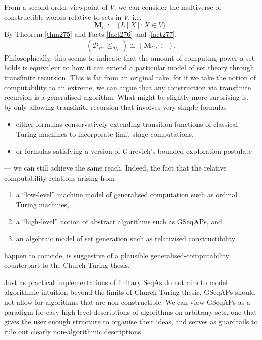 \documentclass[12pt, twoside]{memoir}
\numberwithin{equation}{section}
\theoremstyle{definition}
\theoremstyle{remark}
\theoremstyle{definition}
\theoremstyle{definition}
\theoremstyle{definition}
\theoremstyle{remark}
\begin{document}
From a second-order viewpoint of $V$, we can consider the multiverse of constructible worlds relative to sets in $V$, i.e.
\begin{equation*}
    \mathbf{M}_C := \{L[X] : X \in V\} \text{.}
\end{equation*}
By Theorem \ref{thm275} and Facts \ref{fact276} and \ref{fact277}, 
\begin{equation*}
    (\mathcal{D}_P, \leq_{\mathcal{D}_P}) \cong (\mathbf{M}_C, \subset) \text{.}
\end{equation*}
Philosophically, this seems to indicate that the amount of computing power a set holds is equivalent to how it can extend a particular model of set theory through transfinite recursion. This is far from an original take, for if we take the notion of computability to an extreme, we can argue that any construction via transfinite recursion is a generalised algorithm. What might be slightly more surprising is, by only allowing transfinite recursion that involves very simple formulas ---
\begin{itemize}
    \item either formulas conservatively extending transition functions of classical Turing machines to incorporate limit stage computations,
    \item or formulas satisfying a version of Gurevich's bounded exploration postulate
\end{itemize}
--- we can still achieve the same reach. Indeed, the fact that the relative computability relations arising from
\begin{enumerate}[label=(GCT\arabic*), leftmargin=50pt]
    \item\label{gct1} a ``low-level'' machine model of generalised computation such as ordinal Turing machines, 
    \item\label{gct2} a ``high-level'' notion of abstract algorithms such as GSeqAPs, and
    \item\label{gct3} an algebraic model of set generation such as relativised constructibility
\end{enumerate}
happen to coincide, is suggestive of a plausible generalised-computability counterpart to the Church-Turing thesis.

Just as practical implementations of finitary SeqAs do not aim to model algorithmic intuition beyond the limits of Church-Turing thesis, GSeqAPs should not allow for algorithms that are non-constructible. We can view GSeqAPs as a paradigm for easy high-level descriptions of algorithms on arbitrary sets, one that gives the user enough structure to organise their ideas, and serves as guardrails to rule out clearly non-algorithmic descriptions.
\end{document}
